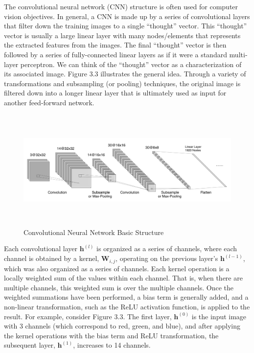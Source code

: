 \documentclass [MAS] {uclathes}
\begin{document}
The convolutional neural network (CNN) structure is often used for computer vision objectives. In general, a CNN is made up by a series of convolutional layers that filter down the training images to a single ``thought'' vector. This ``thought'' vector is usually a large linear layer with many nodes/elements that represents the extracted features from the images. The final ``thought'' vector is then followed by a series of fully-connected linear layers as if it were a standard multi-layer perceptron. We can think of the ``thought'' vector as a characterization of its associated image. Figure 3.3 illustrates the general idea. Through a variety of transformations and subsampling (or pooling) techniques, the original image is filtered down into a longer linear layer that is ultimately used as input for another feed-forward network.

\begin{figure}[h]
\centering
\includegraphics[height = 60mm, width=160mm]{imgs/cnn_s1.png}
\caption{Convolutional Neural Network Basic Structure}
\label{fig:cnn1}
\end{figure}

Each convolutional layer $\mathbf{h}^{(l)}$ is organized as a series of channels, where each channel is obtained by a kernel, $\mathbf{W}_{i, j}$, operating on the previous layer's $\mathbf{h}^{(l-1)}$, which was also organized as a series of channels.  Each kernel operation is a locally weighted sum of the values within each channel. That is, when there are multiple channels, this weighted sum is over the multiple channels. Once the weighted summations have been performed, a bias term is generally added, and a non-linear transformation, such as the ReLU activation function, is applied to the result. For example, consider Figure 3.3. The first layer, $\mathbf{h}^{(0)}$ is the input image with 3 channels (which correspond to red, green, and blue), and after applying the kernel operations with the bias term and ReLU transformation, the subsequent layer, $\mathbf{h}^{(1)}$, increases to 14 channels. 
\end{document}
